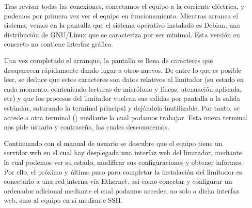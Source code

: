 \label{img:lms7_open}

Tras revisar todas las conexiones, conectamos el equipo a la corriente eléctrica, y podemos por primera vez ver el equipo en funcionamiento. Mientras arranca el sistema, vemos en la pantalla que el sistema operativo instalado es Debian, una distribución de \gls{GNU/Linux} que se caracteriza por ser minimal. Esta versión en concreto no contiene interfaz gráfica.

Una vez completado el arranque, la pantalla se llena de caracteres que desaparecen rápidamente dando lugar a otros nuevos. De entre lo que es posible leer, se deduce que estos caracteres son datos relativos al limitador (su estado en cada momento, conteniendo lecturas de micrófono y líneas, atenuación aplicada, etc) y que los procesos del limitador vuelcan sus salidas por pantalla a la salida estándar, saturando la terminal principal y dejándola inutilizable. Por tanto, se accede a otra terminal () mediante la cual podamos trabajar. Esta nueva terminal nos pide usuario y contraseña, las cuales desconocemos.

Continuando con el manual de usuario se descubre que el equipo tiene un servidor web en el cual hay desplegada una interfaz web del limitador, mediante la cual podemos ver su estado, modificar sus configuraciones y obtener informes. Por ello, el próximo y último paso para completar la instalación del limitador es conectarlo a una red interna vía Ethernet, así como conectar y configurar un ordenador adicional mediante el cual podamos acceder, no solo a dicha interfaz web, sino al equipo en sí mediante \acrshort{SSH}.

